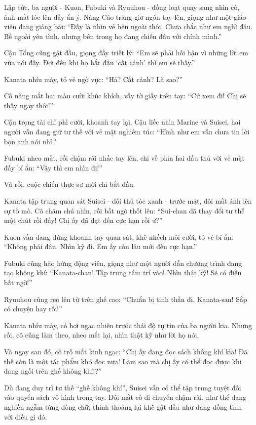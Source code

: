 \documentclass[../main.tex]{subfiles}
\begin{document}

Lập tức, ba người - Kuon, Fubuki và Ryuuhou - đồng loạt quay sang nhìn cô, ánh mắt lóe lên đầy ẩn ý. Nàng Cáo trăng giơ ngón tay lên, giọng như một giáo viên đang giảng bài: ``Đấy là nhìn vẻ bên ngoài thôi. Chưa chắc như em nghĩ đâu. Bề ngoài yên tĩnh, nhưng bên trong họ đang chiến đấu với chính mình.''

Cậu Tổng cũng gật đầu, giọng đầy triết lý: ``Em sẽ phải hối hận vì những lời em vừa nói đấy. Đợi đến khi họ bắt đầu `cất cánh' thì em sẽ thấy.''

Kanata nhíu mày, tỏ vẻ ngờ vực: ``Hả? Cất cánh? Là sao?''

Cô nàng mắt hai màu cười khúc khích, vẫy tờ giấy trên tay: ``Cứ xem đi! Chị sẽ thấy ngay thôi!''

Cậu trọng tài chỉ phì cười, khoanh tay lại. Cậu liếc nhìn Marine và Suisei, hai người vẫn đang giữ tư thế với vẻ mặt nghiêm túc: ``Hình như em vẫn chưa tin lời bọn anh nói nhỉ.''

Fubuki nheo mắt, rồi chậm rãi nhấc tay lên, chỉ về phía hai đấu thủ với vẻ mặt đầy bí ẩn: ``Vậy thì em nhìn đi!''

Và rồi, cuộc chiến thực sự mới chỉ bắt đầu.

Kanata tập trung quan sát Suisei - đối thủ tóc xanh - trước mặt, đôi mắt ánh lên sự tò mò. Cô chăm chú nhìn, rồi bất ngờ thốt lên: ``Sui-chan đã thay đổi tư thế một chút rồi đấy! Chị ấy đã đạt đến cực hạn rồi ư?''

Kuon vẫn đang đứng khoanh tay quan sát, khẽ nhếch môi cười, tỏ vẻ bí ẩn: ``Không phải đâu. Nhìn kỹ đi. Em ấy còn lâu mới đến cực hạn.''

Fubuki cũng hào hứng động viên, giọng như một người dẫn chương trình đang tạo không khí: ``Kanata-chan! Tập trung tâm trí vào! Nhìn thật kỹ! Sẽ có điều bất ngờ!''

Ryuuhou cũng reo lên từ trên ghế cao: ``Chuẩn bị tinh thần đi, Kanata-san! Sắp có chuyện hay rồi!''

Kanata nhíu mày, có hơi ngạc nhiên trước thái độ tự tin của ba người kia. Nhưng rồi, cô cũng làm theo, nheo mắt lại, nhìn thật kỹ như lời họ nói.

Và ngay sau đó, cô trố mắt kinh ngạc: ``Chị ấy đang đọc sách không khí kìa! Đã thế còn là một tác phẩm khó đọc nữa! Làm sao mà chị ấy có thể đọc được khi đang ngồi trên ghế không khí!?''


Dù đang duy trì tư thế ``ghế không khí'', Suisei vẫn có thể tập trung tuyệt đối vào quyển sách vô hình trong tay. Đôi mắt cô di chuyển chậm rãi, như thể đang nghiền ngẫm từng dòng chữ, thỉnh thoảng lại khẽ gật đầu như đang đồng tình với điều gì đó.
\end{document}
